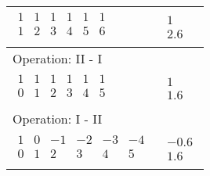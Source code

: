 \begin{longtable}{p{4cm}|p{3cm}}
    $\displaystyle\begin{matrix}
                          1 & 1 & 1 & 1 & 1 & 1 \\
                          1 & 2 & 3 & 4 & 5 & 6 \\
                      \end{matrix}$                    &
    $\displaystyle\begin{matrix}
                          1 \\
                          2.6
                      \end{matrix}$                                                               \\\hline
    \multicolumn{2}{p{\dimexpr4cm+3cm+2\tabcolsep\relax}}{Operation: II - I}                  \\\hline\pagebreak[0]
    $\displaystyle\begin{matrix}
                          1 & 1 & 1 & 1 & 1 & 1 \\
                          0 & 1 & 2 & 3 & 4 & 5 \\
                      \end{matrix}$                    &
    $\displaystyle\begin{matrix}
                          1 \\
                          1.6
                      \end{matrix}$                                                               \\\hline
    \multicolumn{2}{p{\dimexpr4cm+3cm+2\tabcolsep\relax}}{Operation: I - II}                  \\\hline\pagebreak[0]
    $\displaystyle\begin{matrix}
                          1 & 0 & -1 & -2 & -3 & -4 \\
                          0 & 1 & 2  & 3  & 4  & 5  \\
                      \end{matrix}$                    &
    $\displaystyle\begin{matrix}
                          -0.6 \\
                          1.6
                      \end{matrix}$                                                               \\\hline
\end{longtable}

